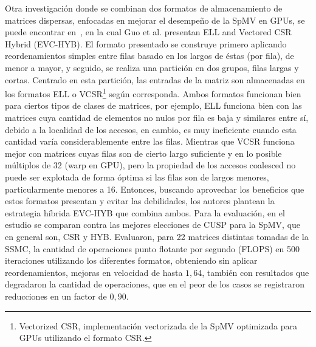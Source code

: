 Otra investigación donde se combinan dos formatos de almacenamiento de matrices dispersas, enfocadas en mejorar el desempeño de la SpMV en GPUs, se puede encontrar en~\cite{Guo2015}, en la cual Guo et al. presentan ELL and Vectored CSR Hybrid (EVC-HYB). 
El formato presentado se construye primero aplicando reordenamientos simples entre filas basado en los largos de éstas (\nnz por fila), de menor a mayor, y seguido, se realiza una partición en dos grupos, filas largas y cortas. Centrado en esta partición, las entradas de la matriz son almacenadas en los formatos ELL o VCSR\footnote{Vectorized CSR, implementación vectorizada de la SpMV optimizada para GPUs utilizando el formato CSR.} según corresponda. Ambos formatos funcionan bien para ciertos tipos de clases de matrices, por ejemplo, ELL funciona bien con las matrices cuya cantidad de elementos no nulos por fila  es baja y similares entre sí, debido a la localidad de los accesos, en cambio, es muy ineficiente cuando esta cantidad varía considerablemente entre las filas. Mientras que VCSR funciona mejor con matrices cuyas filas son de cierto largo suficiente y en lo posible múltiplos de 32 (warp en GPU), pero la propiedad de los accesos coalesced no puede ser explotada de forma óptima si las filas son de largos menores, particularmente menores a 16. Entonces, buscando aprovechar los beneficios que estos formatos presentan y evitar las debilidades, los autores plantean la estrategia híbrida EVC-HYB que combina ambos. Para la evaluación, en el estudio se comparan contra las mejores elecciones de CUSP para la SpMV, que en general son, CSR y HYB. Evaluaron, para 22 matrices distintas tomadas de la SSMC, la cantidad de operaciones punto flotante por segundo (FLOPS) en 500 iteraciones utilizando los diferentes formatos, obteniendo sin aplicar reordenamientos, mejoras en velocidad de hasta $1,64$, también con resultados que degradaron la cantidad de operaciones, que en el peor de los casos se registraron reducciones en un factor de $0,90$. 




